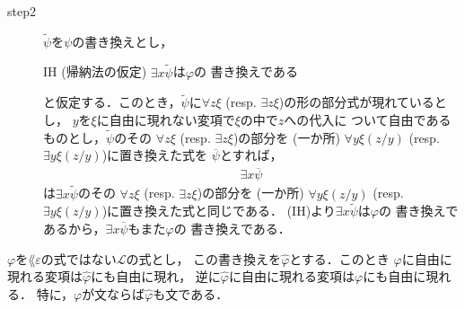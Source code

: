 \begin{metaprf}
\begin{description}
\begin{description}
					\item[step2]
						$\widetilde{\psi}$を$\psi$の書き換えとし，
						\begin{itembox}[l]{IH (帰納法の仮定)}
							$\exists x \widetilde{\psi}$は$\varphi$の
							書き換えである
						\end{itembox}
						と仮定する．このとき，$\widetilde{\psi}$に$\forall z \xi$ 
						(resp. $\exists z \xi$)の形の部分式が現れているとし，
						$y$を$\xi$に自由に現れない変項で$\xi$の中で$z$への代入に
						ついて自由であるものとし，$\widetilde{\psi}$のその
						$\forall z \xi$ (resp. $\exists z \xi$)の部分を
						(一か所) $\forall y \xi(z/y)$
						(resp. $\exists y \xi(z/y)$)に置き換えた式を
						$\overline{\psi}$とすれば，
						\begin{align}
							\exists x \overline{\psi}
						\end{align}
						は$\exists x \widetilde{\psi}$のその
						$\forall z \xi$ (resp. $\exists z \xi$)の部分を
						(一か所) $\forall y \xi(z/y)$
						(resp. $\exists y \xi(z/y)$)に置き換えた式と同じである．
						(IH)より$\exists x \widetilde{\psi}$は$\varphi$の
						書き換えであるから，$\exists x \overline{\psi}$もまた$\varphi$の
						書き換えである．
						\QED
				\end{description}
		\end{description}
	\end{metaprf}
	
	\begin{screen}
		\begin{metathm}[書き換えによって自由な変項は増減しない]
		\label{metathm:variables_unchanged_after_rewriting}
			$\varphi$を$\lang{\varepsilon}$の式ではない$\mathcal{L}$の式とし，
			この書き換えを$\widehat{\varphi}$とする．このとき
			$\varphi$に自由に現れる変項は$\widehat{\varphi}$にも自由に現れ，
			逆に$\widehat{\varphi}$に自由に現れる変項は$\varphi$にも自由に現れる．
			特に，$\varphi$が文ならば$\widehat{\varphi}$も文である．
		\end{metathm}
	\end{screen}
	
